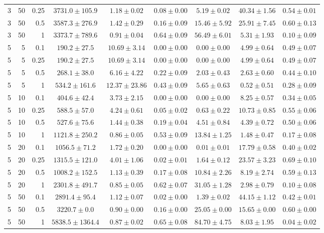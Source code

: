 \begin{table}[htbp]
\begin{tabular}{@{}rrrcccccc@{}}
3 & 50 & 0.25 & $3731.0 \pm 105.9$ & $1.18 \pm 0.02$ & $0.08 \pm 0.00$ & $5.19 \pm 0.02$ & $40.34 \pm 1.56$ & $0.54 \pm 0.01$ \\
3 & 50 & 0.5 & $3587.3 \pm 276.9$ & $1.42 \pm 0.29$ & $0.16 \pm 0.09$ & $15.46 \pm 5.92$ & $25.91 \pm 7.45$ & $0.60 \pm 0.13$ \\
3 & 50 & 1 & $3373.7 \pm 789.6$ & $0.91 \pm 0.04$ & $0.64 \pm 0.09$ & $56.49 \pm 6.01$ & $5.31 \pm 1.93$ & $0.10 \pm 0.09$ \\
\midrule
5 & 5 & 0.1 & $190.2 \pm 27.5$ & $10.69 \pm 3.14$ & $0.00 \pm 0.00$ & $0.00 \pm 0.00$ & $4.99 \pm 0.64$ & $0.49 \pm 0.07$ \\
5 & 5 & 0.25 & $190.2 \pm 27.5$ & $10.69 \pm 3.14$ & $0.00 \pm 0.00$ & $0.00 \pm 0.00$ & $4.99 \pm 0.64$ & $0.49 \pm 0.07$ \\
5 & 5 & 0.5 & $268.1 \pm 38.0$ & $6.16 \pm 4.22$ & $0.22 \pm 0.09$ & $2.03 \pm 0.43$ & $2.63 \pm 0.60$ & $0.44 \pm 0.10$ \\
5 & 5 & 1 & $534.2 \pm 161.6$ & $12.37 \pm 23.86$ & $0.43 \pm 0.09$ & $5.65 \pm 0.63$ & $0.52 \pm 0.51$ & $0.28 \pm 0.09$ \\
5 & 10 & 0.1 & $404.6 \pm 42.4$ & $3.73 \pm 2.15$ & $0.00 \pm 0.00$ & $0.00 \pm 0.00$ & $8.25 \pm 0.57$ & $0.34 \pm 0.05$ \\
5 & 10 & 0.25 & $588.5 \pm 57.0$ & $4.24 \pm 0.61$ & $0.05 \pm 0.02$ & $0.63 \pm 0.22$ & $10.73 \pm 0.85$ & $0.55 \pm 0.06$ \\
5 & 10 & 0.5 & $527.6 \pm 75.6$ & $1.44 \pm 0.38$ & $0.19 \pm 0.04$ & $4.51 \pm 0.84$ & $4.39 \pm 0.72$ & $0.50 \pm 0.06$ \\
5 & 10 & 1 & $1121.8 \pm 250.2$ & $0.86 \pm 0.05$ & $0.53 \pm 0.09$ & $13.84 \pm 1.25$ & $1.48 \pm 0.47$ & $0.17 \pm 0.08$ \\
5 & 20 & 0.1 & $1056.5 \pm 71.2$ & $1.72 \pm 0.20$ & $0.00 \pm 0.00$ & $0.01 \pm 0.01$ & $17.79 \pm 0.58$ & $0.40 \pm 0.02$ \\
5 & 20 & 0.25 & $1315.5 \pm 121.0$ & $4.01 \pm 1.06$ & $0.02 \pm 0.01$ & $1.64 \pm 0.12$ & $23.57 \pm 3.23$ & $0.69 \pm 0.10$ \\
5 & 20 & 0.5 & $1008.2 \pm 152.5$ & $1.13 \pm 0.39$ & $0.17 \pm 0.08$ & $10.84 \pm 2.26$ & $8.19 \pm 2.74$ & $0.59 \pm 0.13$ \\
5 & 20 & 1 & $2301.8 \pm 491.7$ & $0.85 \pm 0.05$ & $0.62 \pm 0.07$ & $31.05 \pm 1.28$ & $2.98 \pm 0.79$ & $0.10 \pm 0.08$ \\
5 & 50 & 0.1 & $2891.4 \pm 95.4$ & $1.12 \pm 0.07$ & $0.02 \pm 0.00$ & $1.39 \pm 0.02$ & $44.15 \pm 1.12$ & $0.42 \pm 0.01$ \\
5 & 50 & 0.5 & $3220.7 \pm 0.0$ & $0.90 \pm 0.00$ & $0.16 \pm 0.00$ & $25.05 \pm 0.00$ & $15.65 \pm 0.00$ & $0.60 \pm 0.00$ \\
5 & 50 & 1 & $5838.5 \pm 1364.4$ & $0.87 \pm 0.02$ & $0.65 \pm 0.08$ & $84.70 \pm 4.75$ & $8.03 \pm 1.95$ & $0.04 \pm 0.02$ \\
\bottomrule
\end{tabular}
\end{table}
